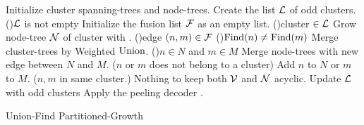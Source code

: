 \begin{algorithm}[h!]
  \BlankLine
  \BlankLine
  Initialize cluster spanning-trees and node-trees.\;\label{algo:B1a}%
  Create the list $\mathcal{L}$ of odd clusters.\;
  \While(){$\mathcal{L}$ is not empty}{
    Initialize the fusion list $\mathcal{F}$ as an empty list.\;\label{algo:B1b}
    \For(){cluster $\in\mathcal{L}$ \label{algo:B2a}}{
      Grow node-tree $\mathcal{N}$ of cluster with . \label{line:grow}
    }
    \For(){edge $(n,m) \in \mathcal{F}$\label{algo:B3a}}{
      \eIf(){$\operatorname{Find}(n)\neq\operatorname{Find}(m)$}{
        Merge cluster-trees by Weighted $\operatorname{Union}$.\;
        \eIf(){$n \in N$ and $m \in M$\label{algo:joina}}{
          Merge node-trees with new edge between $N$ and $M$.
        }($n$ or $m$ does not belong to a cluster){
          Add $n$ to $N$ or $m$ to $M$.\;\label{algo:joinb}
        }
      }($n,m$ in same cluster.\label{algo:dfa}){
        Nothing to keep both $\mathcal{V}$ and $\mathcal{N}$ acyclic.\;\label{algo:dfb} 
      }
    }
    Update $\mathcal{L}$ with odd clusters\; \label{algo:B3b}
  }
  Apply the peeling decoder \cite{delfosse2017linear}.\label{algo:B4a}
  \caption{Union-Find Partitioned-Growth}\label{algo:ufbb}
\end{algorithm}